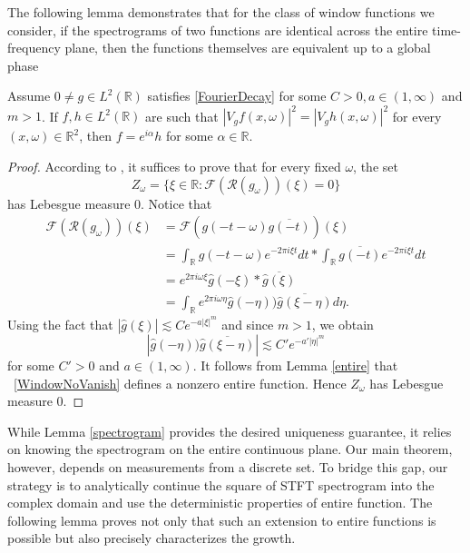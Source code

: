 \documentclass[graybox]{svmult}
\newcommand{\R}{\mathbb{R}}
\newcommand{\cR}{\mathcal{R}}
\begin{document}
The following lemma demonstrates that for the class of window functions we consider, if the spectrograms of two functions are identical across the entire time-frequency plane, then the functions themselves are equivalent up to a global phase
\begin{lemma}\label{spectrogram}
    Assume $0\neq  g \in L^2(\R)$ satisfies \eqref{FourierDecay} for some $C >0, a\in (1,\infty)$ and $m>1$. If $f,h \in L^2(\R)$ are such that $|V_gf(x,\omega)|^2=|V_gh(x,\omega)|^2$ for every $(x,\omega) \in \R^{2}$, then $f = e^{i\alpha}h$ for some $\alpha \in \R$.
\end{lemma}
\begin{proof}
    According to \cite[Corollary 3.3]{grohs2024phaseless}, it suffices to prove that for every fixed $\omega$, the set
    $$Z_\omega = \{ \xi \in \R: \mathcal{F}(\cR(g_\omega))(\xi) = 0\}$$
    has Lebesgue measure $0$. Notice that
    \begin{align}\label{WindowNoVanish}
    \mathcal{F}(\cR(g_\omega))(\xi) &= \mathcal{F}(g(-t-\omega)\overline{g(-t)})(\xi) \nonumber\\
    &= \int_\R g(-t-\omega)e^{-2 \pi i \xi t} dt  *\int_\R \overline{g(-t)}e^{-2 \pi i \xi t}dt\nonumber\\
    &=e^{2 \pi i \omega \xi}\hat{g}(-\xi)*\overline{\hat{g}(\xi)}\nonumber\\
    &= \int_{\R} e^{2\pi i \omega\eta}\hat{g}(- \eta))\overline{\hat{g}(\xi- \eta)}d\eta.
    \end{align}
    Using the fact that  $|\hat{g}(\xi)| \lesssim Ce^{-a|\xi|^m}$ and since $m > 1$, we obtain 
    $$|\hat{g}(- \eta))\overline{\hat{g}(\xi- \eta)}| \lesssim C' e^{-a'|\eta|^m}$$
    for some $C' >0$ and $a \in (1,\infty)$. It follows from Lemma \ref{entire} that ~\eqref{WindowNoVanish} defines a nonzero entire function. Hence $Z_\omega$ has Lebesgue measure $0$.
\end{proof}
While Lemma \ref{spectrogram} provides the desired uniqueness guarantee, it relies on knowing the spectrogram on the entire continuous plane. Our main theorem, however, depends on measurements from a discrete set. To bridge this gap, our strategy is to analytically continue the square of STFT spectrogram into the complex domain and use the deterministic properties of entire function. The following lemma proves not only that such an extension to entire functions is possible but also precisely characterizes the growth.
\end{document}
